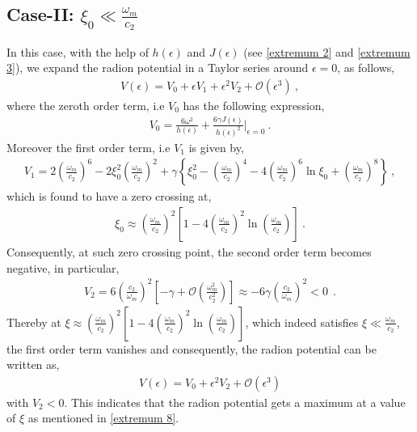 \documentclass{article}
\begin{document}
 \subsection*{Case-II: $\xi_\mathrm{0} \ll \frac{\omega_m}{c_2}$}
 In this case, with the help of $h(\epsilon)$ and $J(\epsilon)$ 
 (see \ref{extremum 2} and \ref{extremum 3}), we expand the radion potential in a Taylor series around $\epsilon = 0$, as follows, 
 \begin{eqnarray}
  V(\epsilon) = V_\mathrm{0} + \epsilon V_\mathrm{1} + \epsilon^2 V_\mathrm{2} + \mathcal{O}\left(\epsilon^3\right)~,
  \label{extremum 5}
 \end{eqnarray}
where the zeroth order term, i.e $V_\mathrm{0}$ has the following expression,
 \begin{eqnarray}
  V_\mathrm{0} = \frac{6\omega^2}{h(\epsilon)} + \frac{6\gamma J(\epsilon)}{h(\epsilon)^2}\bigg|_{\epsilon = 0}~.
  \label{extremum 6}
 \end{eqnarray}
 Moreover the first order term, i.e $V_\mathrm{1}$ is given by,
 \begin{eqnarray}
  V_\mathrm{1} = 2\left(\frac{\omega_m}{c_2}\right)^6 - 2\xi_\mathrm{0}^2\left(\frac{\omega_m}{c_2}\right)^2 
  + \gamma\left\{\xi_\mathrm{0}^2 - \left(\frac{\omega_m}{c_2}\right)^4 - 4\left(\frac{\omega_m}{c_2}\right)^6\ln{\xi_\mathrm{0}} 
  + \left(\frac{\omega_m}{c_2}\right)^8\right\}~,
  \label{extremum 7}
 \end{eqnarray}
 which is found to have a zero crossing at,
 \begin{eqnarray}
  \xi_\mathrm{0} \approx \left(\frac{\omega_m}{c_2}\right)^2\left[1 - 4\left(\frac{\omega_m}{c_2}\right)^2\ln{\left(\frac{\omega_m}{c_2}\right)}\right]~.
  \label{extremum 8}
 \end{eqnarray}
 Consequently, at such zero crossing point, the second order term becomes negative, in particular,
 \begin{eqnarray}
  V_\mathrm{2} = 6\left(\frac{c_2}{\omega_m}\right)^2\left[-\gamma + \mathcal{O}\left(\frac{\omega_m^2}{c_2^2}\right)\right] 
  \approx -6\gamma\left(\frac{c_2}{\omega_m}\right)^2 < 0~~.
  \label{extremum 9}
 \end{eqnarray}
 Thereby at $\xi \approx \left(\frac{\omega_m}{c_2}\right)^2\left[1 - 4\left(\frac{\omega_m}{c_2}\right)^2\ln{\left(\frac{\omega_m}{c_2}\right)}\right]$, 
 which indeed satisfies $\xi \ll \frac{\omega_m}{c_2}$, the first order term vanishes and consequently, the radion potential can be written as,
 \begin{eqnarray}
  V(\epsilon) = V_\mathrm{0} + \epsilon^2 V_\mathrm{2} + \mathcal{O}\left(\epsilon^3\right)\nonumber
 \end{eqnarray}
with $V_\mathrm{2} < 0$. This indicates that the radion potential gets a maximum at a value of $\xi$ as mentioned in \ref{extremum 8}.
 
\end{document}
